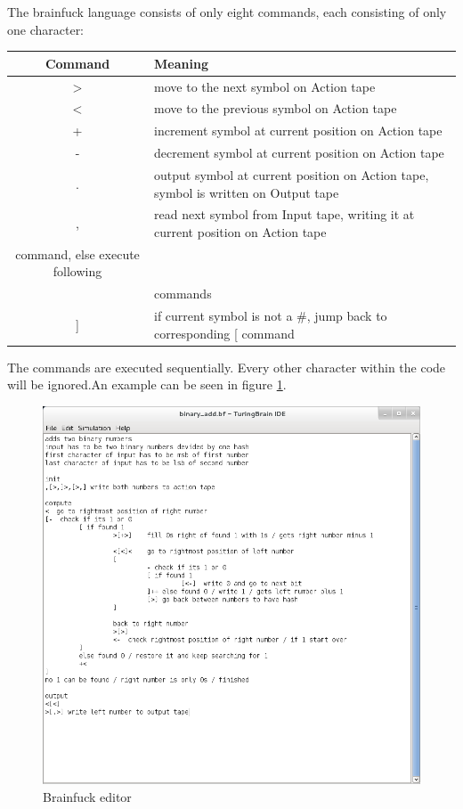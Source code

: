 \documentclass[%
  a4paper,%
  11pt,%
  blue,%
  hyperref	%
  ]{tubsartcl}
\begin{document}
The brainfuck language consists of only eight commands, each consisting of only one character:\\

\begin{tabular}{|c|l|}
\hline
\textbf{Command} & \textbf{Meaning} \\
\hline
$>$ & move to the next symbol on Action tape \\
\hline
$<$ & move to the previous symbol on Action tape \\
\hline
+ & increment symbol at current position on Action tape \\
\hline
- & decrement symbol at current position on Action tape \\
\hline
. & output symbol at current position on Action tape, symbol is written on Output tape \\
\hline
, & read next symbol from Input tape, writing it at current position on Action tape \\
\hline
[ & if current symbol is a \#, move to corresponding ] command, else execute following\\
\ & commands \\
\hline
] & if current symbol is not a \#, jump back to corresponding [ command \\
\hline
\end{tabular}

\bigskip
The commands are executed sequentially. Every other character within the code will be ignored.An example can be seen in figure \ref{pic:brainfuck_editor}.

\begin{figure}[!htb]
\begin{center}
\includegraphics[scale=0.5]{graphics_gui/brainfuck_editor.png}
\end{center}
\caption{Brainfuck editor}
\label{pic:brainfuck_editor}
\end{figure}
\end{document}
